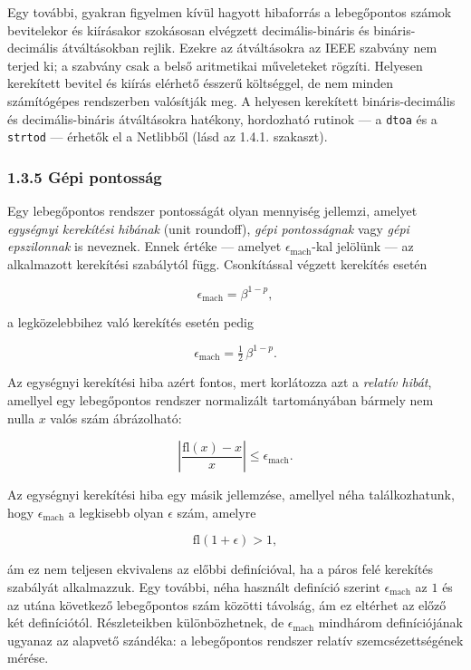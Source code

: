 \documentclass[
  magyar,
  11pt]{article}
\begin{document}
Egy további, gyakran figyelmen kívül hagyott hibaforrás a lebegőpontos
számok bevitelekor és kiírásakor szokásosan elvégzett decimális-bináris
és bináris-decimális átváltásokban rejlik. Ezekre az átváltásokra az
IEEE szabvány nem terjed ki; a szabvány csak a belső aritmetikai
műveleteket rögzíti. Helyesen kerekített bevitel és kiírás elérhető
ésszerű költséggel, de nem minden számítógépes rendszerben valósítják
meg. A helyesen kerekített bináris-decimális és decimális-bináris
átváltásokra hatékony, hordozható rutinok --- a \texttt{dtoa} és a
\texttt{strtod} --- érhetők el a Netlibből (lásd az 1.4.1. szakaszt).

\subsubsection{1.3.5 Gépi pontosság}\label{guxe9pi-pontossuxe1g}

Egy lebegőpontos rendszer pontosságát olyan mennyiség jellemzi, amelyet
\emph{egységnyi kerekítési hibának} (unit roundoff), \emph{gépi
pontosságnak} vagy \emph{gépi epszilonnak} is neveznek. Ennek értéke ---
amelyet \(\epsilon_{\text{mach}}\)-kal jelölünk --- az alkalmazott
kerekítési szabálytól függ. Csonkítással végzett kerekítés esetén

\[\epsilon_{\text{mach}} = \beta^{1-p},\]

a legközelebbihez való kerekítés esetén pedig

\[\epsilon_{\text{mach}} = \tfrac{1}{2}\,\beta^{1-p}.\]

Az egységnyi kerekítési hiba azért fontos, mert korlátozza azt a
\emph{relatív hibát}, amellyel egy lebegőpontos rendszer normalizált
tartományában bármely nem nulla \(x\) valós szám ábrázolható:

\[\left| \frac{\mathrm{fl}(x) - x}{x} \right| \le \epsilon_{\text{mach}}.\]

Az egységnyi kerekítési hiba egy másik jellemzése, amellyel néha
találkozhatunk, hogy \(\epsilon_{\text{mach}}\) a legkisebb olyan
\(\epsilon\) szám, amelyre

\[\mathrm{fl}(1 + \epsilon) > 1,\]

ám ez nem teljesen ekvivalens az előbbi definícióval, ha a páros felé
kerekítés szabályát alkalmazzuk. Egy további, néha használt definíció
szerint \(\epsilon_{\text{mach}}\) az \(1\) és az utána következő
lebegőpontos szám közötti távolság, ám ez eltérhet az előző két
definíciótól. Részleteikben különbözhetnek, de
\(\epsilon_{\text{mach}}\) mindhárom definíciójának ugyanaz az alapvető
szándéka: a lebegőpontos rendszer relatív szemcsézettségének mérése.
\end{document}
